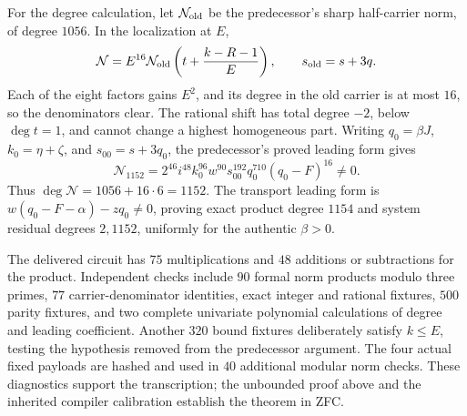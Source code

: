 For the degree calculation, let $\mathcal N_{\rm old}$ be the predecessor's
sharp half-carrier norm, of degree $1056$. In the localization at $E$,
\begin{equation}
 \mathcal N=E^{16}\mathcal N_{\rm old}
       \left(t+\frac{k-R-1}{E}\right),\qquad s_{\rm old}=s+3q.
 \label{eq:eleven-degreeidentity}
\end{equation}
Each of the eight factors gains $E^2$, and its degree in the old carrier
is at most $16$, so the denominators clear. The rational shift has total
degree $-2$, below $\deg t=1$, and cannot change a highest homogeneous part.
Writing $q_0=\beta J$, $k_0=\eta+\zeta$, and $s_{00}=s+3q_0$, the
predecessor's proved leading form gives
\[
 \mathcal N_{1152}
 =2^{46}i^{48}k_0^{96}w^{90}s_{00}^{192}
 q_0^{710}(q_0-F)^{16}\ne0.
\]
Thus $\deg\mathcal N=1056+16\cdot6=1152$. The transport leading form is
$w(q_0-F-\alpha)-zq_0\ne0$, proving exact product degree $1154$ and
system residual degrees $2,1152$, uniformly for the authentic $\beta>0$.

The delivered circuit has $75$ multiplications and $48$ additions or
subtractions for the product. Independent checks include $90$ formal norm
products modulo three primes, $77$ carrier-denominator identities, exact
integer and rational fixtures, $500$ parity fixtures, and two complete
univariate polynomial calculations of degree and leading coefficient.
Another $320$ bound fixtures deliberately satisfy $k\le E$, testing the
hypothesis removed from the predecessor argument. The four actual fixed
payloads are hashed and used in $40$ additional modular norm checks.
These diagnostics support the transcription; the unbounded proof above and
the inherited compiler calibration establish the theorem in ZFC.
